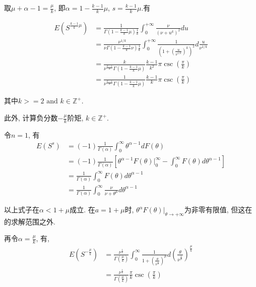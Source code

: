 \documentclass[a4paper, 12pt]{ctexart}
\begin{document}
取$\mu +\alpha -1=\frac{\mu}{k}$, 即$\alpha=1-\frac{k-1}{k}\mu$, $s=\frac{k-1}{k}\mu$.有

\begin{equation}
\begin{split}
E(S^{\frac{k-1}{k}\mu})&=\frac{1}{\Gamma (1-\frac{k-1}{k}\mu)\frac{1}{k}}\int _0^{+\infty}\frac{\nu}{(\nu +u^k)^2}du\\
&=\frac{\nu^{1/k}}{\nu\Gamma(1-\frac{k-1}{k}\nu)\frac{1}{k}}\int _0^{+\infty}\frac{1}{(1 +(\frac{u}{\nu^{1/k}})^k)^2}d\frac{u}{\nu^{1/k}}\\
&=\frac{k}{\nu^{\frac{k-1}{k}}\Gamma(1-\frac{k-1}{k}\mu)}\frac{k-1}{k^2}\pi \csc (\frac{\pi}{k})\\
&=\frac{1}{\nu^{\frac{k-1}{k}}\Gamma(1-\frac{k-1}{k}\mu)}\frac{k-1}{k}\pi \csc (\frac{\pi}{k})
\end{split}
\end{equation}

其中$k>=2 \text{ and } k\in \mathbb{Z^+}$.

此外,   计算负分数$-\frac{\mu}{k}$阶矩,   $k \in \mathbb{Z^+}$. 

令$n=1$,  有
\begin{equation}
\begin{split}
E(S^s)&=(-1)\frac{1}{\Gamma (\alpha)} \int _0 ^{\infty} \theta ^{\alpha-1} d F(\theta)\\
&=(-1) \frac{1}{\Gamma (\alpha)}[\theta ^{\alpha-1} F(\theta)\bigg|^{\infty}_{0} - \int _0 ^{\infty} F(\theta)d \theta ^{\alpha-1}]\\
&= \frac{1}{\Gamma (\alpha)}\int _0 ^{\infty}F(\theta)d\theta ^{\alpha-1} \\
&= \frac{1}{\Gamma (\alpha)}\int _0 ^{\infty}\frac{\nu}{\nu + \theta ^{\mu}}d\theta ^{\alpha-1}
\end{split}
\end{equation}

以上式子在$\alpha<1+\mu$成立. 在$a=1+\mu$时,   $\theta ^\alpha F(\theta)\bigg|_{\theta \rightarrow +\infty}$为非零有限值,   但这在的求解范围之外.


再令$\alpha=\frac{\mu}{k}$,  有,  
\begin{equation}
\begin{split}
E(S^{-\frac{\mu}{k}})&=\frac{\nu ^{\frac{1}{k}}}{\Gamma (\frac {\mu}{k})} \int _0 ^{\infty} \frac{1}{1+(\frac{\theta}{\nu^{\frac{1}{\mu}}} )^{\mu} } d(\frac{\theta}{\nu ^ {\frac{1}{\mu}}})^{\frac{\mu}{k}} \\
&= \frac{\nu ^{\frac{1}{k}}}{\Gamma (\frac {\mu}{k})} \frac{\pi}{k}\csc (\frac{\pi}{k})
\end{split}
\end{equation}
\end{document}
